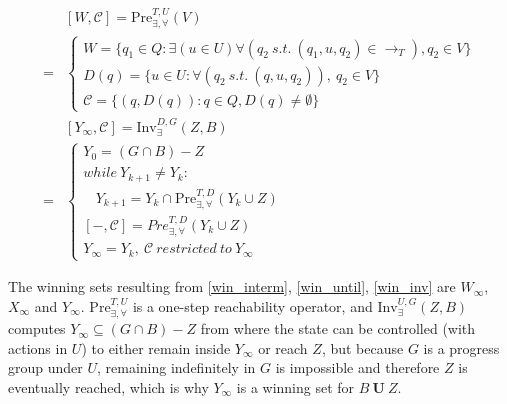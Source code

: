\begin{align}
&[W,\mathcal{C}]=\text{Pre}_{\exists,\forall}^{T,U}(V)\\
=&\begin{cases}
W = \{q_1\in Q: \exists (u\in U) \forall (q_2\ s.t.\ (q_1, u, q_2) \in \rightarrow_T), q_2\in V\}\\
D(q)=\{u\in U: \forall (q_2\ s.t.\ (q,u,q_2)),\ q_2\in V\}\\
\mathcal{C}=\{(q,D(q)):q\in Q, D(q)\not=\emptyset\}
\end{cases}\label{eqn:pre}\\
&[Y_{\infty},\mathcal{C}]=\text{Inv}_{\exists}^{D,G}(Z,B)\\
=&\begin{cases}Y_0 = (G\cap B) - Z\\
while\ Y_{k+1}\not=Y_k:\\
\ \ \ \ Y_{k+1} = Y_k\cap \text{Pre}_{\exists,\forall}^{T,D}(Y_k\cup Z)\\
[-,\mathcal{C}] = Pre^{T,D}_{\exists,\forall}(Y_k\cup Z)\\
Y_{\infty} = Y_k,\ \mathcal{C}\ restricted\ to\ Y_{\infty}
\end{cases} \label{win_inv}
\end{align}

The winning sets {\color{purple} resulting from} \eqref{win_interm}, \eqref{win_until}, \eqref{win_inv} are $ W_{\infty} $, $ X_{\infty} $ and $ Y_{\infty} $. {\color{purple} $\text{Pre}_{\exists,\forall}^{T,U}$ is a one-step reachability operator, and $\text{Inv}_{\exists}^{U,G}(Z,B)$ computes $Y_\infty \subseteq (G\cap B) - Z$ from where the state can be controlled (with actions in $U$) to either remain inside $Y_\infty$ or reach $Z$, but because $G$ is a progress group under $U$, remaining indefinitely in $G$ is impossible and therefore $Z$ is
	eventually reached, which is why $Y_\infty$ is a winning set for $B\mathbf{\ U\ }Z$.}


